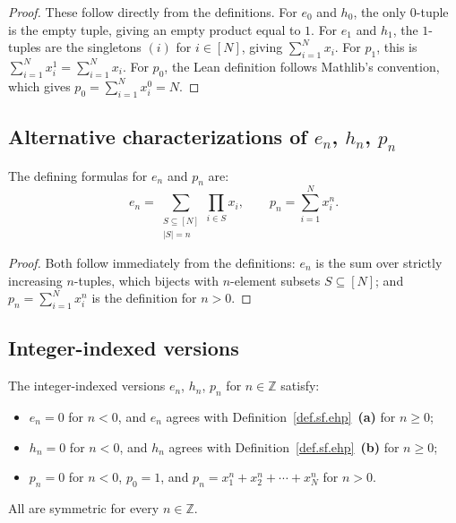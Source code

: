 \begin{proof}
These follow directly from the definitions. For $e_0$ and $h_0$, the only
$0$-tuple is the empty tuple, giving an empty product equal to $1$. For $e_1$
and $h_1$, the $1$-tuples are the singletons $(i)$ for $i \in [N]$, giving
$\sum_{i=1}^N x_i$. For $p_1$, this is $\sum_{i=1}^N x_i^1 = \sum_{i=1}^N x_i$.
For $p_0$, the Lean definition follows Mathlib's convention, which gives
$p_0 = \sum_{i=1}^N x_i^0 = N$.
\end{proof}

\subsection{Alternative characterizations of $e_n$, $h_n$, $p_n$}

\begin{lemma}
\label{lem.sf.ehp-alt-characterizations}
\leanhelper
\leanok
The defining formulas for $e_n$ and $p_n$ are:
\[
e_n = \sum_{\substack{S \subseteq [N] \\ |S| = n}} \prod_{i \in S} x_i,
\qquad
p_n = \sum_{i=1}^N x_i^n.
\]
\end{lemma}

\begin{proof}
Both follow immediately from the definitions:
$e_n$ is the sum over strictly increasing $n$-tuples, which bijects with
$n$-element subsets $S \subseteq [N]$; and $p_n = \sum_{i=1}^N x_i^n$
is the definition for $n > 0$.
\end{proof}

\subsection{Integer-indexed versions}

\begin{lemma}
\label{lem.sf.integer-indexed}
\leanhelper
\leanok
The integer-indexed versions $e_n$, $h_n$, $p_n$ for $n \in \mathbb{Z}$ satisfy:
\begin{itemize}
\item $e_n = 0$ for $n < 0$, and $e_n$ agrees with Definition~\ref{def.sf.ehp}~\textbf{(a)} for $n \geq 0$;
\item $h_n = 0$ for $n < 0$, and $h_n$ agrees with Definition~\ref{def.sf.ehp}~\textbf{(b)} for $n \geq 0$;
\item $p_n = 0$ for $n < 0$, $p_0 = 1$, and $p_n = x_1^n + x_2^n + \cdots + x_N^n$ for $n > 0$.
\end{itemize}
All are symmetric for every $n \in \mathbb{Z}$.
\end{lemma}

